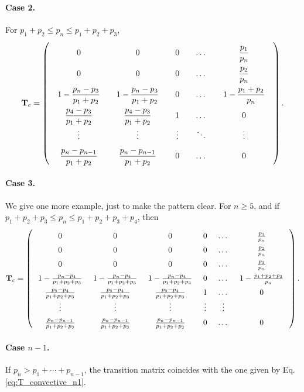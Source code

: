\documentclass[12pt]{article}
\begin{document}
\paragraph{Case 2.}

For $p_1 + p_2 \le p_n \le p_1 + p_2 + p_3$,
$$
  \mathbf T_{c}
=
\left(
  \arraycolsep=10.0pt\def\arraystretch{2.0}
  \begin{array}{cccccc}
    0     &   0   &   0   &   \dots  &   \dfrac{p_1}{p_n}       \\
    0     &   0   &   0   &   \dots  &   \dfrac{p_2}{p_n} \\
    1 - \dfrac{p_n - p_3}{p_1 + p_2}  &   1 - \dfrac{p_n - p_3}{p_1 + p_2}  &   0   &   \dots  &   1 - \dfrac{p_1+p_2}{p_n} \\
    \dfrac{p_4 - p_3}{p_1 + p_2}     &  \dfrac{p_4 - p_3}{p_1 + p_2}   &   1   &   \dots  &   0 \\
    \vdots&\vdots &\vdots &   \ddots &   \vdots \\
    \dfrac{p_n - p_{n-1}}{p_1 + p_2} &  \dfrac{p_n - p_{n-1}}{p_1 + p_2} &   0   &   \dots  &   0 \\
  \end{array}
\right).
$$

\paragraph{Case 3.}

We give one more example, just to make the pattern clear.
%
For $n \ge 5$, and
if $p_1 + p_2 + p_3 \le p_n \le p_1 + p_2 + p_3 + p_4$,
then
$$
  \mathbf T_{c}
=
\left(
  \arraycolsep=7.0pt\def\arraystretch{1.5}
  \begin{array}{cccccccc}
    0     &   0   &   0   &   0 & \dots  &   \frac{p_1}{p_n}       \\
    0     &   0   &   0   &   0 & \dots  &   \frac{p_2}{p_n} \\
    0     &   0   &   0   &   0 & \dots  &   \frac{p_3}{p_n} \\
    1 - \frac{p_n - p_4}{p_1 + p_2 + p_3}  &
    1 - \frac{p_n - p_4}{p_1 + p_2 + p_3}  &
    1 - \frac{p_n - p_4}{p_1 + p_2 + p_3}  & 0   &   \dots  &   1 - \frac{p_1+p_2 + p_3}{p_n} \\
    \frac{p_5 - p_4}{p_1 + p_2 + p_3}   &
    \frac{p_5 - p_4}{p_1 + p_2 + p_3}   &
    \frac{p_5 - p_4}{p_1 + p_2 + p_3}   &
    1   &   \dots  &   0 \\
    \vdots&\vdots &\vdots & \vdots  &   \vdots \\
    \frac{p_n - p_{n-1}}{p_1 + p_2 + p_3} &
    \frac{p_n - p_{n-1}}{p_1 + p_2 + p_3} &
    \frac{p_n - p_{n-1}}{p_1 + p_2 + p_3} &
    0   &   \dots  &   0 \\
  \end{array}
\right).
$$

\paragraph{Case $n - 1$.}

If $p_n > p_1 + \cdots + p_{n-1}$,
the transition matrix coincides
with the one given by Eq. \eqref{eq:T_convective_n1}.
\end{document}

